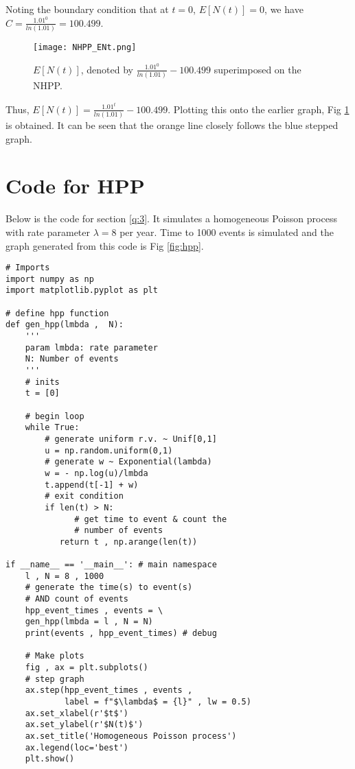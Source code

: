 \documentclass[%
 reprint,
 amsmath,amssymb,
 aps,
]{revtex4-2}
\theoremstyle{definition}
\begin{document}
Noting the boundary condition that at $t=0$, $E[N(t)]=0$, we have $C = \frac{1.01^0}{ln(1.01)} = 100.499$.\\

\begin{figure}[H]
\centering
\texttt{[image: NHPP\_ENt.png]}
\caption{\label{fig:nhppent}$E[N(t)]$, denoted by $\frac{1.01^0}{ln(1.01)} - 100.499$ superimposed on the NHPP.}
\end{figure}

Thus,  $E[N(t)] = \frac{1.01^t}{ln(1.01)} - 100.499$. Plotting this onto the earlier graph, Fig \ref{fig:nhppent} is obtained. It can be seen that the orange line closely follows the blue stepped graph.

\appendix

\section{\label{app:hppcode}Code for HPP}
Below is the code for section \ref{q:3}. It simulates a homogeneous Poisson process with rate parameter $\lambda=8$ per year. Time to 1000 events is simulated and the graph generated from this code is Fig \ref{fig:hpp}.
\begin{verbatim}
# Imports
import numpy as np
import matplotlib.pyplot as plt

# define hpp function
def gen_hpp(lmbda ,  N):
    '''
    param lmbda: rate parameter
    N: Number of events
    '''
    # inits
    t = [0]

    # begin loop
    while True:
        # generate uniform r.v. ~ Unif[0,1]
        u = np.random.uniform(0,1) 
        # generate w ~ Exponential(lambda)
        w = - np.log(u)/lmbda 
        t.append(t[-1] + w)
        # exit condition
        if len(t) > N:
        	  # get time to event & count the 
        	  # number of events
           return t , np.arange(len(t)) 

if __name__ == '__main__': # main namespace
    l , N = 8 , 1000
    # generate the time(s) to event(s) 
    # AND count of events 
    hpp_event_times , events = \
    gen_hpp(lmbda = l , N = N) 
    print(events , hpp_event_times) # debug
    
    # Make plots
    fig , ax = plt.subplots()
    # step graph
    ax.step(hpp_event_times , events , 
    		label = f"$\lambda$ = {l}" , lw = 0.5) 
    ax.set_xlabel(r'$t$')
    ax.set_ylabel(r'$N(t)$')
    ax.set_title('Homogeneous Poisson process')
    ax.legend(loc='best')
    plt.show()
\end{verbatim}
\end{document}
